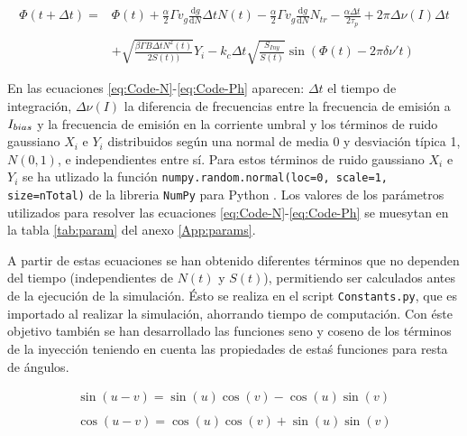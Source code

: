 			\begin{equation}
				\begin{matrix}
					\Phi(t + \Delta t) =  & \Phi(t) + \frac{\alpha}{2}\Gamma v_g \frac{\mathrm{d}g}{\mathrm{d}N} \Delta t N(t) - \frac{\alpha}{2}\Gamma v_g \frac{\mathrm{d} g}{\mathrm{d}N} N_{tr} - \frac{\alpha\Delta t}{2\tau_p} + 2\pi\Delta\nu(I)\Delta t \\ \\
					& + \sqrt{\frac{\beta \Gamma B \Delta t N^2(t)}{2 S(t))}} Y_i - k_c\Delta t\sqrt{\frac{S_{Iny}}{S(t)}} \sin(\Phi(t) - 2\pi \delta\nu't)
				\end{matrix}
				\label{eq:Code-Ph}
			\end{equation}

		En las ecuaciones \ref{eq:Code-N}-\ref{eq:Code-Ph} aparecen: $\Delta t$ el tiempo de integraci\'on, $\Delta\nu(I)$ la diferencia de frecuencias entre la frecuencia de emisi\'on a $I_{bias}$ y la frecuencia de emisi\'on en la corriente umbral \cite{Chaves19} y los t\'erminos de ruido gaussiano $X_i$ e $Y_i$ distribuidos según una normal de media 0 y desviación típica 1, $N(0, 1)$, e independientes entre s\'i. Para estos t\'erminos de ruido gaussiano $X_i$ e $Y_i$ se ha utlizado la funci\'on \texttt{numpy.random.normal(loc=0, scale=1, size=nTotal)} de la libreria \texttt{NumPy} para Python \cite{numpy}. Los valores de los par\'ametros utilizados para resolver las ecuaciones \ref{eq:Code-N}-\ref{eq:Code-Ph} se muesytan en la tabla \ref{tab:param} del anexo \ref{App:params}.

		A partir de estas ecuaciones se han obtenido diferentes t\'erminos que no dependen del tiempo (independientes de $N(t)$ y $S(t)$), permitiendo ser calculados antes de la ejecuci\'on de la simulaci\'on. \'Esto se realiza en el script \texttt{Constants.py}, que es importado al realizar la simulaci\'on, ahorrando tiempo de computaci\'on. Con \'este objetivo tambi\'en se han desarrollado las funciones seno y coseno de los t\'erminos de la inyecci\'on teniendo en cuenta las propiedades de esta\'s funciones para resta de \'angulos.

			\begin{equation}
				\begin{matrix}
					\sin(u - v) = \sin(u)\cos(v) - \cos(u)\sin(v) \\ \\

					\cos(u - v) = \cos(u)\cos(v) + \sin(u)\sin(v) 
				\end{matrix}
			\end{equation}


